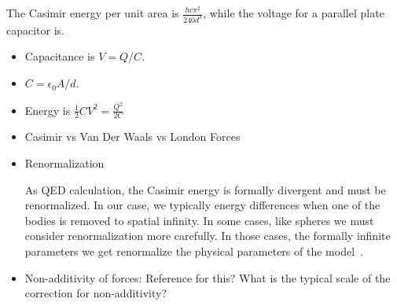 \begin{itemize}
The Casimir energy per unit area is $\frac{\hbar c\pi^2}{240 d^3}$, while the voltage for a parallel plate capacitor is.
\begin{shaded}
\begin{itemize}
\item Capacitance is $V=Q/C$.  
\item $C = \epsilon_0 A/d$.  
\item Energy is $\frac{1}{2}CV^2=\frac{Q^2}{2C} $
\end{itemize}
\end{shaded}

\end{itemize}


\begin{itemize}
\item Casimir vs Van Der Waals vs London Forces



\item Renormalization

As QED calculation, the Casimir energy is formally divergent and must be renormalized. 
 In our case, we typically energy differences when one of the bodies is 
removed to spatial infinity.
  In some cases, like spheres we must consider renormalization more carefully.
  In those cases, the formally infinite parameters we get renormalize the 
physical parameters of the model~\cite{Milton2001}.  

\item Non-additivity of forces:  Reference for this?  What is the typical scale of the correction for non-additivity?


\end{itemize}
